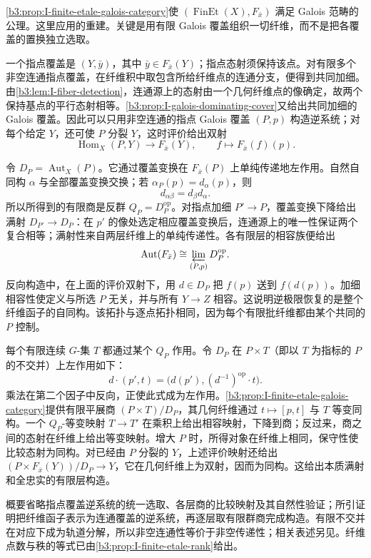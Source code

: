 \begin{proofsketch}
	\cref{b3:prop:I-finite-etale-galois-category}使 \((\operatorname{FinEt}(X),F_{\bar x})\) 满足 Galois 范畴的公理。这里应用\cite[Exposé V, Théorème 4.1 and proof, pp. 98--104]{SGA12003}的重建。关键是用有限 Galois 覆盖组织一切纤维，而不是把各覆盖的置换独立选取。

	一个指点覆盖是 \((Y,\bar y)\)，其中 \(\bar y\in F_{\bar x}(Y)\)；指点态射须保持该点。对有限多个非空连通指点覆盖，在纤维积中取包含所给纤维点的连通分支，便得到共同加细。由\cref{b3:lem:I-fiber-detection}，连通源上的态射由一个几何纤维点的像确定，故两个保持基点的平行态射相等。\cref{b3:prop:I-galois-dominating-cover}又给出共同加细的 Galois 覆盖。因此可以只用非空连通的指点 Galois 覆盖 \((P,p)\) 构造逆系统；对每个给定 \(Y\)，还可使 \(P\) 分裂 \(Y\)，这时评价给出双射
	\[
		\operatorname{Hom}_X(P,Y)\longrightarrow F_{\bar x}(Y),
		\qquad f\longmapsto F_{\bar x}(f)(p).
	\]

	令 \(D_P=\operatorname{Aut}_X(P)\)。它通过覆盖变换在 \(F_{\bar x}(P)\) 上单纯传递地左作用。自然自同构 \(\alpha\) 与全部覆盖变换交换；若 \(\alpha_P(p)=d_\alpha(p)\)，则
	\[
		d_{\alpha\beta}=d_\beta d_\alpha.
	\]
	所以所得到的有限商是反群 \(Q_P=D_P^{\mathrm{op}}\)。对指点加细 \(P'\rightarrow P\)，覆盖变换下降给出满射 \(D_{P'}\rightarrow D_P\)：在 \(p'\) 的像处选定相应覆盖变换后，连通源上的唯一性保证两个复合相等；满射性来自两层纤维上的单纯传递性。各有限层的相容族便给出
	\[
		\operatorname{Aut}(F_{\bar x})\cong\varprojlim_{(P,p)}D_P^{\mathrm{op}}.
	\]
	反向构造中，在上面的评价双射下，用 \(d\in D_P\) 把 \(f(p)\) 送到 \(f(d(p))\)。加细相容性使定义与所选 \(P\) 无关，并与所有 \(Y\rightarrow Z\) 相容。这说明逆极限恢复的是整个纤维函子的自同构。该拓扑与逐点拓扑相同，因为每个有限批纤维都由某个共同的 \(P\) 控制。

	每个有限连续 \(G\)-集 \(T\) 都通过某个 \(Q_P\) 作用。令 \(D_P\) 在 \(P\times T\)（即以 \(T\) 为指标的 \(P\) 的不交并）上左作用如下：
	\[
		d\cdot(p',t)=\bigl(d(p'),(d^{-1})^{\mathrm{op}}\cdot t\bigr).
	\]
	乘法在第二个因子中反向，正使此式成为左作用。\cref{b3:prop:I-finite-etale-galois-category}提供有限平展商 \((P\times T)/D_P\)，其几何纤维通过 \(t\mapsto[p,t]\) 与 \(T\) 等变同构。一个 \(Q_P\)-等变映射 \(T\rightarrow T'\) 在乘积上给出相容映射，下降到商；反过来，商之间的态射在纤维上给出等变映射。增大 \(P\) 时，所得对象在纤维上相同，保守性使比较态射为同构。对已经由 \(P\) 分裂的 \(Y\)，上述评价映射还给出 \((P\times F_{\bar x}(Y))/D_P\rightarrow Y\)，它在几何纤维上为双射，因而为同构。这给出本质满射和全忠实的有限层构造。

	概要省略指点覆盖逆系统的统一选取、各层商的比较映射及其自然性验证；所引证明把纤维函子表示为连通覆盖的逆系统，再逐层取有限群商完成构造。有限不交并在对应下成为轨道分解，所以非空连通性等价于非空传递性；相关表述另见\cite[Exposé V, Proposition 5.3 and Corollaire 5.4, pp. 105--106]{SGA12003}。纤维点数与秩的等式已由\cref{b3:prop:I-finite-etale-rank}给出。
\end{proofsketch}

